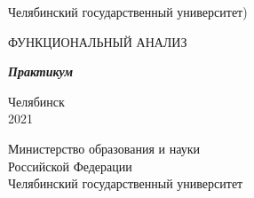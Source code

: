 \documentclass[12pt]{article}						%
\begin{document}
{\bf
\begin{center}
	Челябинский государственный университет)
\end{center}
\vspace*{4cm}

\vspace*{\baselineskip} \vspace*{\baselineskip}
\begin{center}
	ФУНКЦИОНАЛЬНЫЙ АНАЛИЗ
\end{center} {\large
\vspace*{\baselineskip}\vspace*{\baselineskip}\vspace*{\baselineskip}}
\thispagestyle{empty}
\begin{center}
	{\bf\it Практикум}
\end{center}
\vspace*{\baselineskip}

\vspace*{\baselineskip}

\vspace*{4cm}

\begin{center}
	Челябинск\\ 2021
\end{center}
}

\newpage

{\large
\begin{center}
	Министерство  образования и науки\\ Российской
	Федерации\\\vspace*{\baselineskip}  Челябинский государственный университет
\end{center}

\vspace*{2cm}
}
\end{document}
